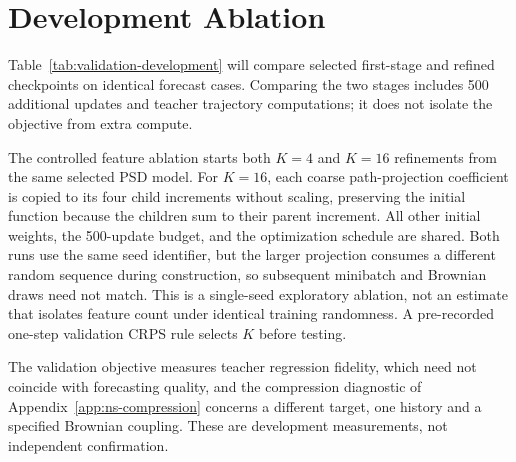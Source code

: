 \section{Development Ablation}\label{app:development}
\begin{table}[t]
\caption{Development validation only: four validation trajectories, three origins, eight ensemble members, one physical forecast interval and one student-training seed. CRPS in normalized coordinates.}
\label{tab:validation-development}
\centering
{}
\end{table}
Table~\ref{tab:validation-development} will compare selected first-stage and refined checkpoints on identical forecast cases. Comparing the two stages includes 500 additional updates and teacher trajectory computations; it does not isolate the objective from extra compute.

The controlled feature ablation starts both $K=4$ and $K=16$ refinements from the same selected PSD model. For $K=16$, each coarse path-projection coefficient is copied to its four child increments without scaling, preserving the initial function because the children sum to their parent increment. All other initial weights, the 500-update budget, and the optimization schedule are shared. Both runs use the same seed identifier, but the larger projection consumes a different random sequence during construction, so subsequent minibatch and Brownian draws need not match. This is a single-seed exploratory ablation, not an estimate that isolates feature count under identical training randomness. A pre-recorded one-step validation CRPS rule selects $K$ before testing. 

The validation objective measures teacher regression fidelity, which need not coincide with forecasting quality, and the compression diagnostic of Appendix~\ref{app:ns-compression} concerns a different target, one history and a specified Brownian coupling. These are development measurements, not independent confirmation.
